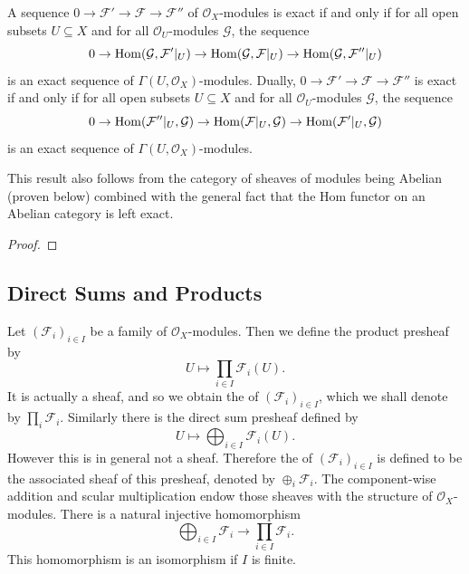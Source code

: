 \begin{proposition}
	A sequence $0 \to \mathcal{F}' \to \mathcal{F} \to \mathcal{F}''$ of $\mathcal{O}_X$-modules is exact if and only if for all open subsets $U \subseteq X$ and for all $\mathcal{O}_U$-modules $\mathcal{G}$, the sequence
	\begin{equation*}
		0 \to \operatorname{Hom}(\mathcal{G}, \mathcal{F}'|_{U}) \to \operatorname{Hom}(\mathcal{G}, \mathcal{F}|_{U}) \to \operatorname{Hom}(\mathcal{G}, \mathcal{F}''|_{U})
	\end{equation*}
	is an exact sequence of $\Gamma(U, \mathcal{O}_X)$-modules. Dually, $0 \to \mathcal{F}' \to \mathcal{F} \to \mathcal{F}''$ is exact if and only if for all open subsets $U \subseteq X$ and for all $\mathcal{O}_U$-modules $\mathcal{G}$, the sequence
	\begin{equation*}
		0 \to \operatorname{Hom}(\mathcal{F}''|_{U}, \mathcal{G})  \to \operatorname{Hom}(\mathcal{F}|_{U}, \mathcal{G}) \to \operatorname{Hom}(\mathcal{F}'|_{U}, \mathcal{G})
	\end{equation*}
	is an exact sequence of $\Gamma(U, \mathcal{O}_X)$-modules.
\end{proposition}

This result also follows from the category of sheaves of modules being Abelian (proven below) combined with the general fact that the Hom functor on an Abelian category is left exact. 

\begin{proof}
\end{proof}

\subsection*{Direct Sums and Products}

Let $(\mathcal{F}_i)_{i \in I}$ be a family of $\mathcal{O}_X$-modules. Then we define the product presheaf by
\begin{equation*}
	U \mapsto \prod_{i \in I} \mathcal{F}_i(U).
\end{equation*}
It is actually a sheaf, and so we obtain the  of $(\mathcal{F}_i)_{i \in I}$, which we shall denote by $\prod_i \mathcal{F}_i$. Similarly there is the direct sum presheaf defined by
\begin{equation*}
	U \mapsto \bigoplus_{i \in I} \mathcal{F}_i(U).
\end{equation*}
However this is in general not a sheaf. Therefore the  of $(\mathcal{F}_i)_{i \in I}$ is defined to be the associated sheaf of this presheaf, denoted by $\oplus_i \mathcal{F}_i$. The component-wise addition and scular multiplication endow those sheaves with the structure of $\mathcal{O}_X$-modules. There is a natural injective homomorphism
\begin{equation*}
	\bigoplus_{i \in I} \mathcal{F}_i \to \prod_{i \in I} \mathcal{F}_i.
\end{equation*}
This homomorphism is an isomorphism if $I$ is finite.

